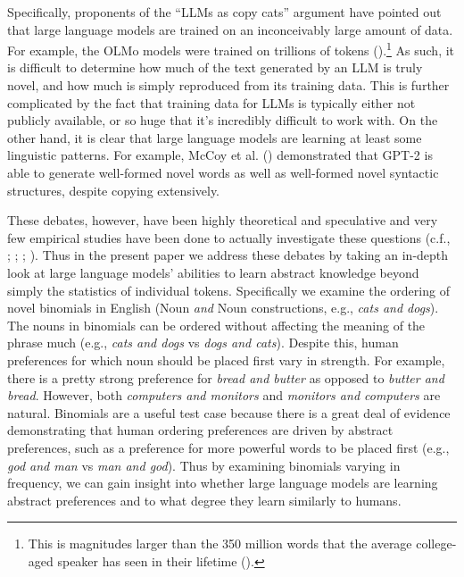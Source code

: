 \documentclass[
  12pt,
  letterpaper,
]{scrreport}
\begin{document}
Specifically, proponents of the ``LLMs as copy cats'' argument have
pointed out that large language models are trained on an inconceivably
large amount of data. For example, the OLMo models were trained on
trillions of tokens
().\footnote{This is magnitudes larger than the 350 million words
  that the average college-aged speaker has seen in their lifetime
  ().} As such, it is difficult to determine how much of the text
generated by an LLM is truly novel, and how much is simply reproduced
from its training data. This is further complicated by the fact that
training data for LLMs is typically either not publicly available, or so
huge that it's incredibly difficult to work with. On the other hand, it
is clear that large language models are learning at least some
linguistic patterns. For example, McCoy et al.
() demonstrated that GPT-2
is able to generate well-formed novel words as well as well-formed novel
syntactic structures, despite copying extensively.

These debates, however, have been highly theoretical and speculative and
very few empirical studies have been done to actually investigate these
questions (c.f., ;
; ;
). Thus in the
present paper we address these debates by taking an in-depth look at
large language models' abilities to learn abstract knowledge beyond
simply the statistics of individual tokens. Specifically we examine the
ordering of novel binomials in English (Noun \emph{and} Noun
constructions, e.g., \emph{cats and dogs}). The nouns in binomials can
be ordered without affecting the meaning of the phrase much (e.g.,
\emph{cats and dogs} vs \emph{dogs and cats}). Despite this, human
preferences for which noun should be placed first vary in strength. For
example, there is a pretty strong preference for \emph{bread and butter}
as opposed to \emph{butter and bread}. However, both \emph{computers and
monitors} and \emph{monitors and computers} are natural. Binomials are a
useful test case because there is a great deal of evidence demonstrating
that human ordering preferences are driven by abstract preferences, such
as a preference for more powerful words to be placed first (e.g.,
\emph{god and man} vs \emph{man and god}). Thus by examining binomials
varying in frequency, we can gain insight into whether large language
models are learning abstract preferences and to what degree they learn
similarly to humans.
\end{document}
